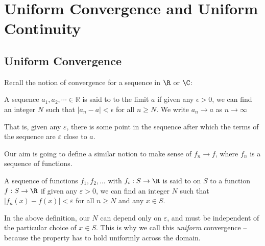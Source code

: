 


\section{Uniform Convergence and Uniform Continuity} 

\subsection{Uniform Convergence}
Recall the notion of convergence for a sequence in $\R$ or $\C$:

\begin{definition}
    A sequence $a_{1}, a_{2}, \cdots \in \mathbb{R}$ is said to  to the limit $a$ if given any $\epsilon>0$, we can find an integer $N$ such that $\left|a_{n}-a\right|<\epsilon$ for all $n \geq N$. We write $a_{n} \rightarrow a$ as $n \rightarrow \infty$
\end{definition}

That is, given any $\varepsilon$, there is some point in the sequence after which the terms of the sequence are $\varepsilon$ close to $a$. 

Our aim is going to define a similar notion to make sense of $f_n \rightarrow f$, where $f_n$ is a sequence of functions.

\begin{definition}
    A sequence of functions $f_1, f_2, \dots$ with $f_i : S \rightarrow \R$ is said to  on $S$ to a function $f:S \rightarrow \R$ if given any $\varepsilon > 0$, we can find an integer $N$ such that $|f_n(x) - f(x)| < \varepsilon$ for all $n \geq N$ and any $x \in S$.
\end{definition}

\begin{remark}
    In the above definition, our $N$ can depend only on $\varepsilon$, and must be independent of the particular choice of $x \in S$. This is why we call this \emph{uniform} convergence -- because the property has to hold uniformly across the domain. 
\end{remark}


